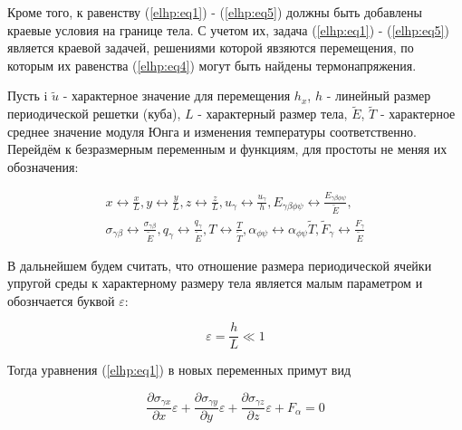 Кроме того, к равенству 
(\ref{elhp:eq1})
-
(\ref{elhp:eq5}) 
должны быть добавлены краевые условия на границе тела. 
С учетом их, задача 
(\ref{elhp:eq1})
-
(\ref{elhp:eq5}) 
является краевой задачей, решениями 
которой явзяются перемещения, по которым их равенства 
(\ref{elhp:eq4}) 
могут быть найдены термонапряжения.

Пусть i
$ \widetilde{u} $ 
- характерное значение для перемещения 
$h_x$, $h$ 
- линейный размер периодической решетки (куба), 
$L$ 
- характерный размер тела,
$ \widetilde{E}$, $ \widetilde{T}$ 
- характерное среднее значение модуля Юнга и изменения температуры соответственно. Перейдём к безразмерным переменным и функциям,
для простоты не меняя их обозначения:

\begin{equation}
    \label{elhp:eq6}
    \begin{aligned}
        x \leftrightarrow \frac{x}{L}, 
        y \leftrightarrow \frac{y}{L}, 
        z \leftrightarrow \frac{z}{L},
        u_{\gamma} \leftrightarrow \frac{u_{\gamma}}{h},
        E_{\gamma\beta\phi\psi} \leftrightarrow \frac{E_{\gamma\beta\phi\psi}}{ \widetilde{E}},
        \\
        \sigma_{\gamma\beta}\leftrightarrow \frac{\sigma_{\gamma\beta}}{ \widetilde{E}},
        q_{\gamma} \leftrightarrow \frac{q_{\gamma}}{ \widetilde{E}},
        T \leftrightarrow \frac{T}{ \widetilde{T}},
        \alpha_{\phi\psi} \leftrightarrow \alpha_{\phi\psi} \widetilde{T},
        \widetilde{F}_{\gamma} \leftrightarrow \frac{F_{\gamma}}{ \widetilde{E}}
    \end{aligned}
\end{equation}

В дальнейшем будем считать, что отношение размера периодической ячейки упругой среды к характерному размеру тела является малым параметром
и обознчается буквой 
$\varepsilon$:

\begin{equation}
    \label{elhp:eq7}
    \varepsilon = \frac{h}{L} \ll 1
\end{equation}

Тогда уравнения 
(\ref{elhp:eq1})
в новых переменных примут вид

\begin{equation}
    \label{elhp:eq8}
    \frac{\partial \sigma_{\gamma x}}{\partial x}\varepsilon +
    \frac{\partial \sigma_{\gamma y}}{\partial y}\varepsilon +
    \frac{\partial \sigma_{\gamma z}}{\partial z}\varepsilon +
    F_{\alpha} = 0
\end{equation}

